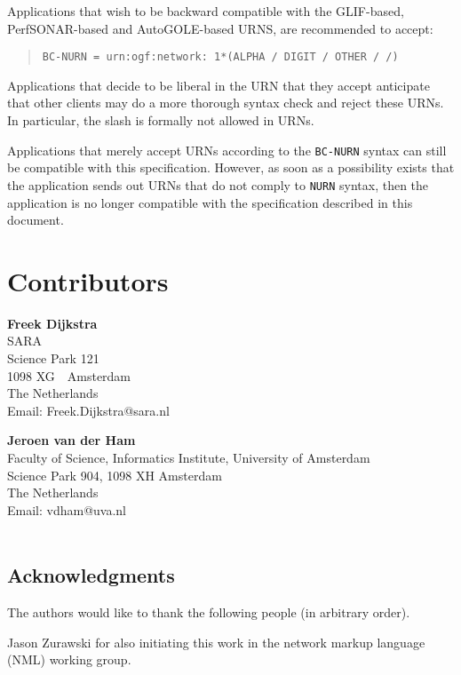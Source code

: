 \documentclass[12pt]{article}  %
\begin{document}
Applications that wish to be backward compatible with the GLIF-based, PerfSONAR-based and AutoGOLE-based URNS, are recommended to accept:

\begin{quote}
  \texttt{BC-NURN = \qq{}urn:ogf:network:\qq{} 1*(ALPHA / DIGIT / OTHER / \qq{}/\qq{})}
\end{quote}

Applications that decide to be liberal in the URN that they accept \MUST{} anticipate that other clients may do a more thorough syntax check and reject these URNs. In particular, the slash is formally not allowed in URNs.

Applications that merely accept URNs according to the \texttt{BC-NURN} syntax can still be compatible with this specification. 
However, as soon as a possibility exists that the application sends out URNs that do not comply to \texttt{NURN} syntax, 
then the application is no longer compatible with the specification described in this document.

\section{Contributors}

\textbf{Freek Dijkstra} \\
SARA \\
Science Park 121 \\
1098 XG\ \  Amsterdam \\
The Netherlands \\
Email: Freek.Dijkstra@sara.nl

\textbf{Jeroen van der Ham} \\
Faculty of Science, Informatics Institute, University of Amsterdam \\
Science Park 904, 1098 XH  Amsterdam  \\
The Netherlands \\
Email: vdham@uva.nl \\
\\

\subsection*{Acknowledgments}

The authors would like to thank the following people (in arbitrary order).

Jason Zurawski for also initiating this work in the network markup language (NML) working group.
\end{document}
